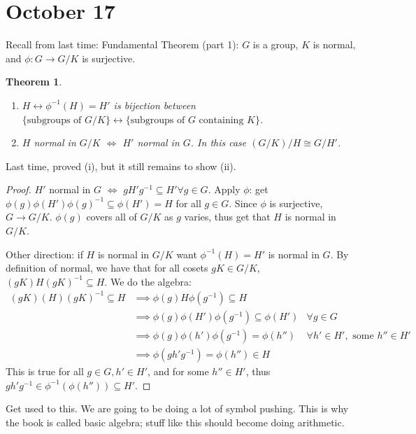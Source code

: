 \documentclass{article}
\theoremstyle{plain}
\newtheorem{theorem}{Theorem}
\theoremstyle{remark}
\begin{document}
\section{October 17}
Recall from last time:
Fundamental Theorem (part 1):
$G$ is a group, $K$ is normal, and $\phi \colon G \to G/K$ is surjective.
\begin{theorem}
	\begin{enumerate}
		\item $H \leftrightarrow \phi^{-1}(H) = H'$ is bijection between
			\newline
		$\{\text{subgroups of }G/K\} \leftrightarrow
		\{\text{subgroups of }G\text{ containing }K\}$.
		\item $H$ normal in $G/K$ $\iff$ $H'$ normal in $G$.
			In this case $(G/K)/H \cong G/H'$.
	\end{enumerate}
\end{theorem}
Last time, proved (i), but it still remains to show (ii).
\begin{proof}
$H'$ normal in $G$ $\iff$ $gH'g^{-1} \subseteq H' \forall g \in G$.
Apply $\phi$: get $\phi(g)\phi(H')\phi(g)^{-1} \subseteq \phi(H') = H$ for all $g \in G$.
Since $\phi$ is surjective, $G \to G/K$.
$\phi(g)$ covers all of $G/K$ as $g$ varies, thus get that $H$ is normal in $G/K$.

Other direction: if $H$ is normal in $G/K$ want $\phi^{-1}(H) = H'$ is normal in $G$.
By definition of normal, we have that for all cosets $gK \in G/K$,
$(gK)H(gK)^{-1} \subseteq H$.
We do the algebra:
\begin{align*}
	(gK)(H)(gK)^{-1} \subseteq H
	&\implies \phi(g) H \phi(g^{-1}) \subseteq H\\
	&\implies \phi(g) \phi(H') \phi(g^{-1}) \subseteq \phi(H')
	& \forall  g \in G\\
	&\implies \phi(g)\phi(h')\phi(g^{-1}) = \phi(h'')
	& \forall h'\in H', \text{ some }h'' \in H'\\
	&\implies \phi(gh'g^{-1}) = \phi(h'') \in H
\end{align*}
This is true for all $g \in G, h' \in H'$, and for some $h'' \in H'$,
thus $gh'g^{-1} \in \phi^{-1}(\phi(h'')) \subseteq H'$.
\end{proof}
Get used to this.
We are going to be doing a lot of symbol pushing.
This is why the book is called basic algebra;
stuff like this should become doing arithmetic.
\end{document}
